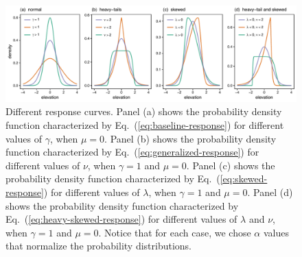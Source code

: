\documentclass[11pt, a4paper]{article}
\begin{document}
\begin{figure}[ht]
  \centering
    \includegraphics[width=1\textwidth]{figures/all-distributions}
	   \caption{Different response curves. Panel (a) shows the probability density function characterized by Eq.~(\ref{eq:baseline-response}) for different values of $\gamma$, when $\mu=0$. Panel (b) shows the probability density function characterized by Eq.~(\ref{eq:generalized-response}) for different values of $\nu$, when $\gamma=1$ and $\mu=0$. Panel (c) shows the probability density function characterized by Eq.~(\ref{eq:skewed-response}) for different values of $\lambda$, when $\gamma=1$ and $\mu=0$. Panel (d) shows the probability density function characterized by Eq.~(\ref{eq:heavy-skewed-response}) for different values of $\lambda$ and $\nu$, when $\gamma=1$ and $\mu=0$. Notice that for each case, we chose $\alpha$ values that normalize the probability distributions.}
      \label{fig:response}
\end{figure}
\end{document}
